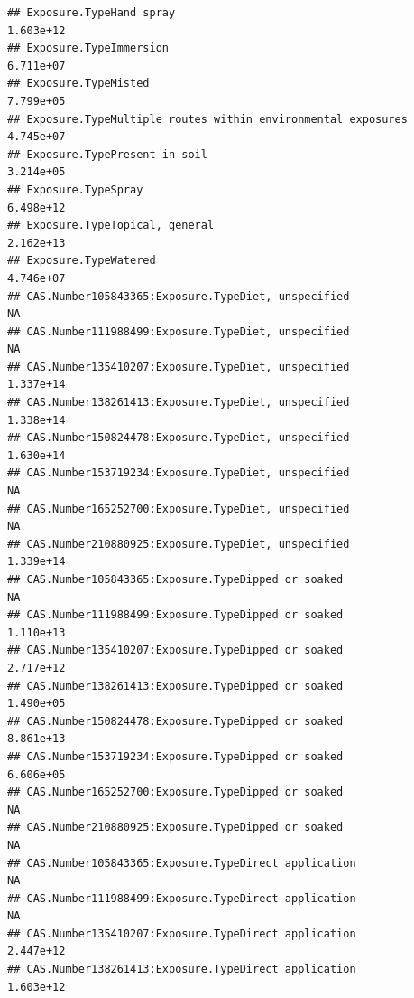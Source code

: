\documentclass[
  12pt,
]{article}
\begin{document}
\begin{verbatim}
## Exposure.TypeHand spray                                                          1.603e+12
## Exposure.TypeImmersion                                                           6.711e+07
## Exposure.TypeMisted                                                              7.799e+05
## Exposure.TypeMultiple routes within environmental exposures                      4.745e+07
## Exposure.TypePresent in soil                                                     3.214e+05
## Exposure.TypeSpray                                                               6.498e+12
## Exposure.TypeTopical, general                                                    2.162e+13
## Exposure.TypeWatered                                                             4.746e+07
## CAS.Number105843365:Exposure.TypeDiet, unspecified                                      NA
## CAS.Number111988499:Exposure.TypeDiet, unspecified                                      NA
## CAS.Number135410207:Exposure.TypeDiet, unspecified                               1.337e+14
## CAS.Number138261413:Exposure.TypeDiet, unspecified                               1.338e+14
## CAS.Number150824478:Exposure.TypeDiet, unspecified                               1.630e+14
## CAS.Number153719234:Exposure.TypeDiet, unspecified                                      NA
## CAS.Number165252700:Exposure.TypeDiet, unspecified                                      NA
## CAS.Number210880925:Exposure.TypeDiet, unspecified                               1.339e+14
## CAS.Number105843365:Exposure.TypeDipped or soaked                                       NA
## CAS.Number111988499:Exposure.TypeDipped or soaked                                1.110e+13
## CAS.Number135410207:Exposure.TypeDipped or soaked                                2.717e+12
## CAS.Number138261413:Exposure.TypeDipped or soaked                                1.490e+05
## CAS.Number150824478:Exposure.TypeDipped or soaked                                8.861e+13
## CAS.Number153719234:Exposure.TypeDipped or soaked                                6.606e+05
## CAS.Number165252700:Exposure.TypeDipped or soaked                                       NA
## CAS.Number210880925:Exposure.TypeDipped or soaked                                       NA
## CAS.Number105843365:Exposure.TypeDirect application                                     NA
## CAS.Number111988499:Exposure.TypeDirect application                                     NA
## CAS.Number135410207:Exposure.TypeDirect application                              2.447e+12
## CAS.Number138261413:Exposure.TypeDirect application                              1.603e+12

\end{verbatim}
\end{document}
